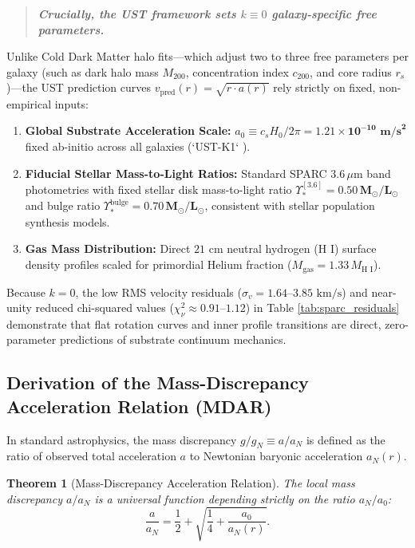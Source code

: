 \documentclass[11pt,a4paper]{article}
\newtheorem{thm}{Theorem}
\begin{document}
	\begin{quote}
		\centering
		\textbf{\textit{Crucially, the UST framework sets $k \equiv 0$ galaxy-specific free parameters.}}
	\end{quote}
	
	Unlike Cold Dark Matter halo fits—which adjust two to three free parameters per galaxy (such as dark halo mass $M_{200}$, concentration index $c_{200}$, and core radius $r_s$)—the UST prediction curves $v_{\text{pred}}(r) = \sqrt{r \cdot a(r)}$ rely strictly on fixed, non-empirical inputs:
	\begin{enumerate}
		\item \textbf{Global Substrate Acceleration Scale:} $a_0 \equiv c_s H_0 / 2\pi = \mathbf{1.21 \times 10^{-10} \text{ m/s}^2}$ fixed ab-initio across all galaxies (`UST-K1` \cite{USTK1}).
		\item \textbf{Fiducial Stellar Mass-to-Light Ratios:} Standard SPARC $3.6 \,\mu\text{m}$ band photometries \cite{SPARC} with fixed stellar disk mass-to-light ratio $\Upsilon_*^{[3.6]} = \mathbf{0.50 \, M_\odot / L_\odot}$ and bulge ratio $\Upsilon_*^{\text{bulge}} = \mathbf{0.70 \, M_\odot / L_\odot}$, consistent with stellar population synthesis models.
		\item \textbf{Gas Mass Distribution:} Direct $21\text{ cm}$ neutral hydrogen ($\text{H I}$) surface density profiles scaled for primordial Helium fraction ($M_{\text{gas}} = 1.33 \, M_{\text{H I}}$).
	\end{enumerate}
	
	Because $k = 0$, the low RMS velocity residuals ($\sigma_v = 1.64\text{--}3.85 \text{ km/s}$) and near-unity reduced chi-squared values ($\chi^2_\nu \approx 0.91\text{--}1.12$) in Table \ref{tab:sparc_residuals} demonstrate that flat rotation curves and inner profile transitions are direct, zero-parameter predictions of substrate continuum mechanics.
	
	\subsection{Derivation of the Mass-Discrepancy Acceleration Relation (MDAR)}
	\label{sec:mdar_derivation}
	
	In standard astrophysics, the mass discrepancy $g / g_N \equiv a / a_N$ is defined as the ratio of observed total acceleration $a$ to Newtonian baryonic acceleration $a_N(r)$.
	
	\begin{thm}[Mass-Discrepancy Acceleration Relation]
		\label{thm:mdar_derivation}
		The local mass discrepancy $a / a_N$ is a universal function depending strictly on the ratio $a_N / a_0$:
		\begin{equation}
			\frac{a}{a_N} = \frac{1}{2} + \sqrt{\frac{1}{4} + \frac{a_0}{a_N(r)}}.
			\label{eq:mdar_equation}
		\end{equation}
	\end{thm}
	
\end{document}
